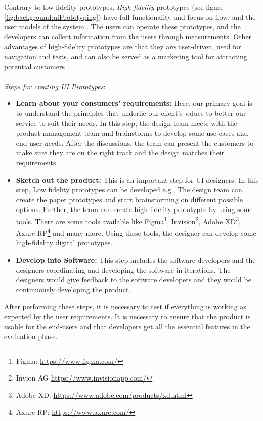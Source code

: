 Contrary to low-fidelity prototypes, \textit{High-fidelity} prototypes (see figure \ref{fig:background:uiPrototyping}) have full functionality and focus on flow, and the user models of the system \cite{article:prototyping:exploratory}.
The users can operate these prototypes, and the developers can collect information from the users through measurements. 
Other advantages of high-fidelity prototypes are that they are user-driven, used for navigation and tests, and can also be served as a marketing tool for attracting potential customers \cite{article:prototyping:highlowfidelity}.\\ \\
\textit{Steps for creating UI Prototypes}:
\begin{itemize}
  \item \textbf{Learn about your consumers' requirements:} Here, our primary goal is to understand the principles that underlie our client's values to better our service to suit their needs. In this step, the design team meets with the product management team and brainstorms to develop some use cases and end-user needs. After the discussions, the team can present the customers to make sure they are on the right track and the design matches their requirements.
  \item \textbf{Sketch out the product:} This is an important step for UI designers. In this step, Low fidelity prototypes can be developed e.g., The design team can create the paper prototypes and start brainstorming on different possible options. Further, the team can create high-fidelity prototypes by using some tools. There are some tools available like Figma\footnote{Figma: \url{https://www.figma.com/}}, Invision\footnote{Invion AG \url{https://www.invisionapp.com/}}, Adobe XD\footnote{Adobe XD: \url{https://www.adobe.com/products/xd.html}}, Axure RP\footnote{Axure RP: \url{https://www.axure.com/}} and many more. Using these tools, the designer can develop some high-fidelity digital prototypes.
  \item \textbf{Develop into Software:} This step includes the software developers and the designers coordinating and developing the software in iterations. The designers would give feedback to the software developers and they would be continuously developing the product.
\end{itemize}

After performing these steps, it is necessary to test if everything is working as expected by the user requirements.
It is necessary to ensure that the product is usable for the end-users and that developers get all the essential features in the evaluation phase. 
\clearpage
